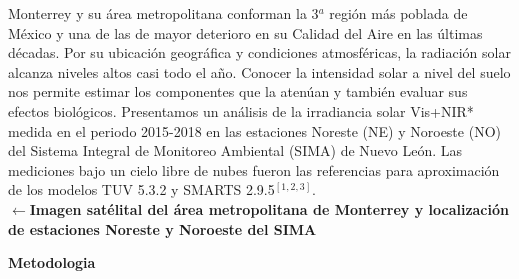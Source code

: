 \documentclass{article}
\begin{document}
\hspace{-0.cm}
\begin{minipage}{0.53\linewidth}
Monterrey y su área metropolitana conforman la 3$^a$ región más poblada
de México y una de las de mayor deterioro en su Calidad del Aire en las últimas décadas. Por su ubicación geográfica y condiciones atmosféricas, la radiación solar alcanza niveles altos casi todo el año. Conocer la intensidad solar a nivel del suelo nos permite estimar los componentes que la atenúan y también evaluar sus efectos biológicos. Presentamos un análisis de la irradiancia solar Vis+NIR* medida en el periodo 2015-2018 en las estaciones Noreste (NE) y Noroeste (NO) del Sistema Integral de Monitoreo Ambiental (SIMA) de Nuevo León. Las mediciones bajo un cielo libre de nubes fueron las referencias para aproximación de los modelos TUV 5.3.2 y SMARTS 2.9.5$^{\left[1,2,3\right]}$.\\
\textbf{\textcolor{ver}{$\leftarrow$Imagen satélital del área metropolitana de Monterrey y
localización de estaciones Noreste y Noroeste del SIMA}}
\end{minipage} 
\begin{center}
\begin{shaded}
\textbf{\textcolor{ver}{Metodologia}}
\end{shaded}
\end{center}
\end{document}
